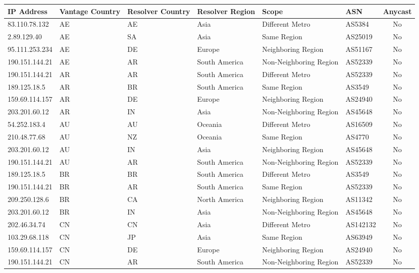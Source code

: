 \begin{table}[h]
	\centering
	\scriptsize
	\begin{tabular}{|l|l|l|l|l|l|c|}
		\hline
		\textbf{IP Address} & \textbf{Vantage Country} & \textbf{Resolver Country} & \textbf{Resolver Region} & \textbf{Scope} & \textbf{ASN} & \textbf{Anycast} \\
		\hline
		\hline
		83.110.78.132 & AE & AE & Asia & Different Metro & AS5384 & No \\
		2.89.129.40 & AE & SA & Asia & Same Region & AS25019 & No \\
		95.111.253.234 & AE & DE & Europe & Neighboring Region & AS51167 & No \\
		190.151.144.21 & AE & AR & South America & Non-Neighboring Region & AS52339 & No \\
		\hline
		190.151.144.21 & AR & AR & South America & Different Metro & AS52339 & No \\
		189.125.18.5 & AR & BR & South America & Same Region & AS3549 & No \\
		159.69.114.157 & AR & DE & Europe & Neighboring Region & AS24940 & No \\
		203.201.60.12 & AR & IN & Asia & Non-Neighboring Region & AS45648 & No \\
		\hline
		54.252.183.4 & AU & AU & Oceania & Different Metro & AS16509 & No \\
		210.48.77.68 & AU & NZ & Oceania & Same Region & AS4770 & No \\
		203.201.60.12 & AU & IN & Asia & Neighboring Region & AS45648 & No \\
		190.151.144.21 & AU & AR & South America & Non-Neighboring Region & AS52339 & No \\
		\hline
		189.125.18.5 & BR & BR & South America & Different Metro & AS3549 & No \\
		190.151.144.21 & BR & AR & South America & Same Region & AS52339 & No \\
		209.250.128.6 & BR & CA & North America & Neighboring Region & AS11342 & No \\
		203.201.60.12 & BR & IN & Asia & Non-Neighboring Region & AS45648 & No \\
		\hline
		202.46.34.74 & CN & CN & Asia & Different Metro & AS142132 & No \\
		103.29.68.118 & CN & JP & Asia & Same Region & AS63949 & No \\
		159.69.114.157 & CN & DE & Europe & Neighboring Region & AS24940 & No \\
		190.151.144.21 & CN & AR & South America & Non-Neighboring Region & AS52339 & No \\

\end{tabular}
\end{table}
